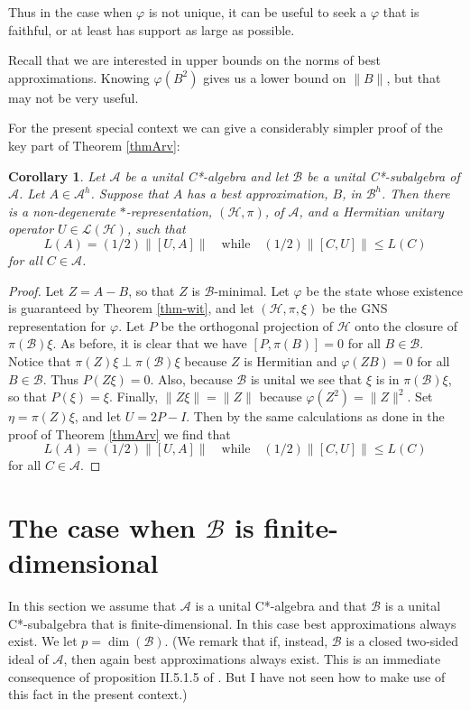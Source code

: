 \documentclass[12pt]{amsart}
\newcommand{\<}{\langle}
\renewcommand{\>}{\rangle}
\newcommand{\var}{\varphi}
\newcommand{\cA}{{\mathcal A}}
\newcommand{\cB}{{\mathcal B}}
\newcommand{\cH}{{\mathcal H}}
\newcommand{\cL}{{\mathcal L}}
\newcommand{\cAH}{{\mathcal A}^h}
\newcommand{\cBH}{{\mathcal B}^h}
\newtheorem{corollary}[theorem]{Corollary}
\theoremstyle{definition}   %
\begin{document}
Thus in the case when $\var$ is not unique, it can be useful to
seek a $\var$ that is faithful, or at least has support as large as possible. 

Recall that we are interested in upper bounds on
the norms of best approximations.
Knowing $\var(B^2)$ gives us a lower bound on $\|B\|$, but that
may not be very useful.

For the present special context we can give a considerably simpler
proof of the key part of Theorem \ref{thmArv}:

\begin{corollary}
Let $\cA$ be a unital C*-algebra and let $\cB$ be a unital C*-subalgebra
of $\cA$. Let $A \in \cAH$. Suppose that $A$ has a best
approximation, $B$, in $\cBH$. Then there is a non-degenerate $*$-representation,
$(\cH, \pi)$, of $\cA$, and a Hermitian unitary operator $U \in \cL(\cH)$,
such that 
 \[
 L(A) = (1/2)\|[U, A]\|
 \quad \mathrm{while} \quad (1/2)\|[C, U]\| \leq L(C)  
\]
for all $C \in \cA$.
\end{corollary}

\begin{proof}
Let $Z = A - B$, so that $Z$ is $\cB$-minimal. Let $\var$ be the state
whose existence is guaranteed by Theorem \ref{thm-wit},  and let
$(\cH, \pi, \xi)$ be the GNS representation for $\var$.  Let $P$
be the orthogonal projection of $\cH$ onto the closure of
$\pi(\cB)\xi$. As before, it is clear that we have $[P, \pi(B)] = 0$
 for all $B \in \cB$. Notice that $\pi(Z)\xi \perp \pi(\cB)\xi$
 because $Z$ is Hermitian and $\var(ZB) = 0$ for all $B \in \cB$. Thus
 $P(Z\xi) = 0$. Also, because $\cB$ is unital we see that $\xi$
 is in $\pi(\cB)\xi$, so that $P(\xi) = \xi$. Finally, $\|Z\xi\| = \|Z\|$
 because $\var(Z^2) = \|Z\|^2$. Set $\eta = \pi(Z)\xi$, and
 let $U = 2P - I$. Then by the same calculations as done in the
 proof of Theorem \ref{thmArv} we find that 
 \[
 L(A) = (1/2)\|[U, A]\|
 \quad \mathrm{while} \quad (1/2)\|[C, U]\| \leq L(C)  
\]
for all $C \in \cA$.   
\end{proof}


\section{The case when $\cB$ is finite-dimensional}
\label{fin-dem}

In this section we assume that $\cA$ is a unital C*-algebra and that $\cB$ 
is a unital C*-subalgebra that is finite-dimensional. In this case best 
approximations always exist. We let $p = \dim(\cB)$. (We remark that
if, instead, $\cB$ is a closed two-sided ideal of $\cA$, then again
best approximations always exist. This is an immediate consequence
of proposition II.5.1.5 of \cite{Blk2}. But I have not seen how to
make use of this fact in the present context.)
\end{document}
